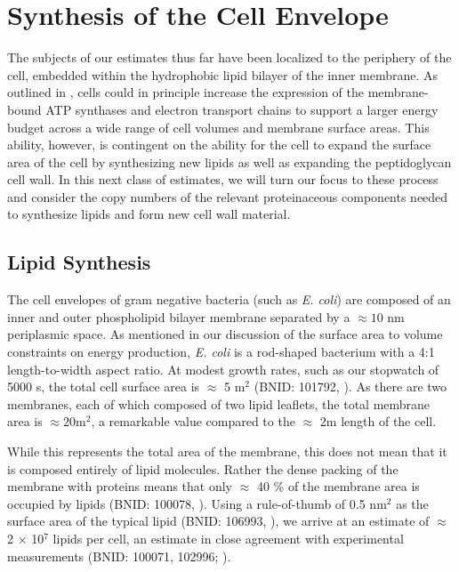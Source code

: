 \section{Synthesis of the Cell Envelope}
The subjects of our estimates thus far have been localized to the periphery of
the cell, embedded within the hydrophobic lipid bilayer of the inner membrane.
As outlined in , cells could in principle increase the
expression of the membrane-bound ATP synthases and electron transport chains to
support a larger energy budget across a wide range of cell volumes and membrane
surface areas. This ability, however, is contingent on the ability for the cell
to expand the surface area of the cell by synthesizing new lipids as well as
expanding the peptidoglycan cell wall. In this next class of estimates, we will
turn our focus to these process and consider the copy numbers of the relevant
proteinaceous components needed to synthesize lipids and form new cell wall
material. 

\subsection{Lipid Synthesis}
The cell envelopes of gram negative bacteria (such as \textit{E. coli}) are
composed of an inner and outer phospholipid bilayer membrane separated by a
$\approx 10$ nm periplasmic space. As mentioned in our discussion of the
surface area to volume constraints on energy production, \textit{E. coli} is
a rod-shaped bacterium with a 4:1 length-to-width aspect ratio. At modest
growth rates, such as our stopwatch of 5000 s, the total cell surface area is
$\approx$ 5 \textmu m$^2$ (BNID: 101792, \cite{milo2010}). As there are two
membranes, each of which composed of two lipid leaflets, the total membrane
area is $\approx 20$\textmu m$^2$, a remarkable value compared to the
$\approx$ 2\textmu m length of the cell.

While this represents the total area of the membrane, this does not mean that it
is composed entirely of lipid molecules. Rather the dense packing of the
membrane with proteins means that only $\approx$ 40 \% of the membrane area is
occupied by lipids (BNID: 100078, \cite{milo2010}). Using a rule-of-thumb of 0.5
nm$^2$ as the surface area of the typical lipid (BNID: 106993, \cite{milo2010}),
we arrive at an estimate of $\approx$ 2 $\times$ 10$^7$ lipids per cell, an
estimate in close agreement with experimental measurements (BNID: 100071,
102996; \cite{milo2010}).

